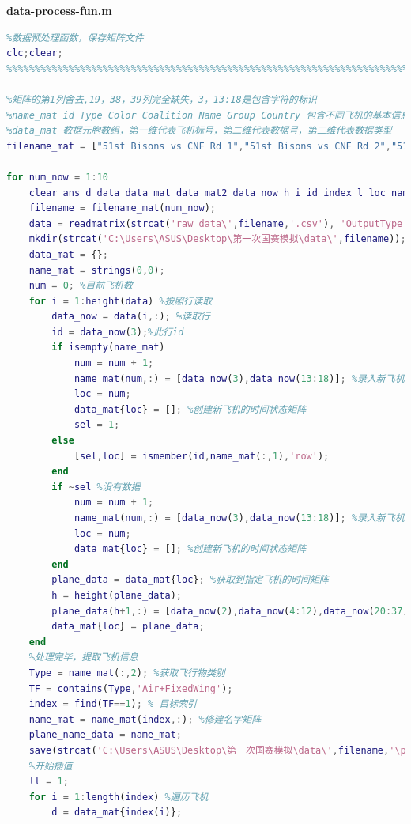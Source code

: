 \documentclass{my_paper}
\begin{document}
\textbf{data-process-fun.m}
\begin{lstlisting}[language=matlab]
    %%%%%%%%%%%%%%%%%%%%%%%%%%%%%%%%%%%%%%%%%%%%%%%%%%%%%%%%%%%%%%%%%%%%%%%%%%%
%数据预处理函数，保存矩阵文件
clc;clear;
%%%%%%%%%%%%%%%%%%%%%%%%%%%%%%%%%%%%%%%%%%%%%%%%%%%%%%%%%%%%%%%%%%%%%%%%%%%

%矩阵的第1列舍去,19，38，39列完全缺失，3，13:18是包含字符的标识
%name_mat id Type Color Coalition Name Group Country 包含不同飞机的基本信息矩阵
%data_mat 数据元胞数组，第一维代表飞机标号，第二维代表数据号，第三维代表数据类型
filename_mat = ["51st Bisons vs CNF Rd 1","51st Bisons vs CNF Rd 2","51st vs 36th R1","51st vs 36th R2","51st vs uvaf round 1","51st vs uvaf round 2","51st vs uvaf round 3","51stKIAP_vs_36th_Round_1","51stKIAP_vs_36th_Round_2","51stKIAP_vs_107th_Round_1"];

for num_now = 1:10
    clear ans d data data_mat data_mat2 data_now h i id index l loc name_mat now num plane_data sel TF TF1 Type
    filename = filename_mat(num_now);
    data = readmatrix(strcat('raw data\',filename,'.csv'), 'OutputType', 'string'); %以字符串格式读入数据
    mkdir(strcat('C:\Users\ASUS\Desktop\第一次国赛模拟\data\',filename));
    data_mat = {};
    name_mat = strings(0,0);
    num = 0; %目前飞机数
    for i = 1:height(data) %按照行读取
        data_now = data(i,:); %读取行  
        id = data_now(3);%此行id
        if isempty(name_mat)
            num = num + 1;
            name_mat(num,:) = [data_now(3),data_now(13:18)]; %录入新飞机信息
            loc = num;
            data_mat{loc} = []; %创建新飞机的时间状态矩阵
            sel = 1;
        else
            [sel,loc] = ismember(id,name_mat(:,1),'row');
        end
        if ~sel %没有数据
            num = num + 1;
            name_mat(num,:) = [data_now(3),data_now(13:18)]; %录入新飞机信息
            loc = num;
            data_mat{loc} = []; %创建新飞机的时间状态矩阵
        end
        plane_data = data_mat{loc}; %获取到指定飞机的时间矩阵
        h = height(plane_data);
        plane_data(h+1,:) = [data_now(2),data_now(4:12),data_now(20:37),data_now(40:43)];
        data_mat{loc} = plane_data;
    end
    %处理完毕，提取飞机信息
    Type = name_mat(:,2); %获取飞行物类别
    TF = contains(Type,'Air+FixedWing');
    index = find(TF==1); % 目标索引
    name_mat = name_mat(index,:); %修建名字矩阵
    plane_name_data = name_mat;
    save(strcat('C:\Users\ASUS\Desktop\第一次国赛模拟\data\',filename,'\plane_name_data.mat'),"plane_name_data"); %保存名字矩阵
    %开始插值
    ll = 1;
    for i = 1:length(index) %遍历飞机
        d = data_mat{index(i)};

\end{lstlisting}
\end{document}
